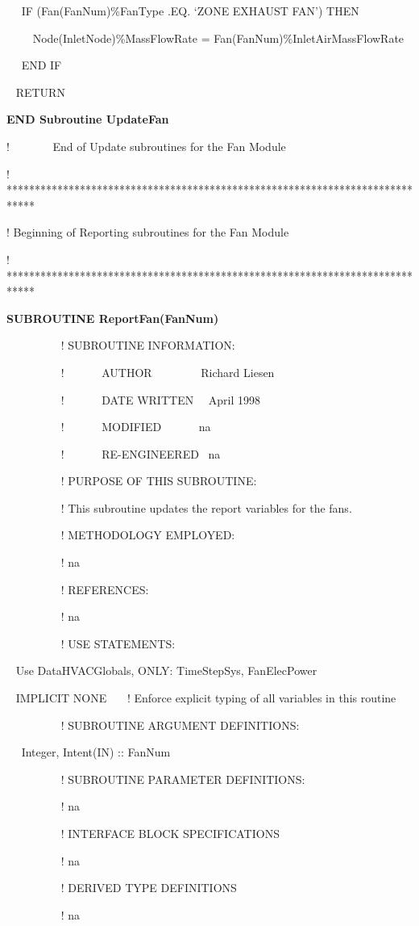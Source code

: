 ~~ IF (Fan(FanNum)\%FanType .EQ. `ZONE EXHAUST FAN') THEN

~~~~ Node(InletNode)\%MassFlowRate = Fan(FanNum)\%InletAirMassFlowRate

~~ END IF

~ RETURN

\textbf{END Subroutine UpdateFan}

!~~~~~~~ End of Update subroutines for the Fan Module

! *****************************************************************************

! Beginning of Reporting subroutines for the Fan Module

! *****************************************************************************

\textbf{SUBROUTINE ReportFan(FanNum)}

~~~~~~~~~ ! SUBROUTINE INFORMATION:

~~~~~~~~~ !~~~~~~ AUTHOR~~~~~~~~ Richard Liesen

~~~~~~~~~ !~~~~~~ DATE WRITTEN~~ April 1998

~~~~~~~~~ !~~~~~~ MODIFIED~~~~~~ na

~~~~~~~~~ !~~~~~~ RE-ENGINEERED~ na

~~~~~~~~~ ! PURPOSE OF THIS SUBROUTINE:

~~~~~~~~~ ! This subroutine updates the report variables for the fans.

~~~~~~~~~ ! METHODOLOGY EMPLOYED:

~~~~~~~~~ ! na

~~~~~~~~~ ! REFERENCES:

~~~~~~~~~ ! na

~~~~~~~~~ ! USE STATEMENTS:

~ Use DataHVACGlobals, ONLY: TimeStepSys, FanElecPower

~ IMPLICIT NONE~~~ ! Enforce explicit typing of all variables in this routine

~~~~~~~~~ ! SUBROUTINE ARGUMENT DEFINITIONS:

~~ Integer, Intent(IN) :: FanNum

~~~~~~~~~ ! SUBROUTINE PARAMETER DEFINITIONS:

~~~~~~~~~ ! na

~~~~~~~~~ ! INTERFACE BLOCK SPECIFICATIONS

~~~~~~~~~ ! na

~~~~~~~~~ ! DERIVED TYPE DEFINITIONS

~~~~~~~~~ ! na


